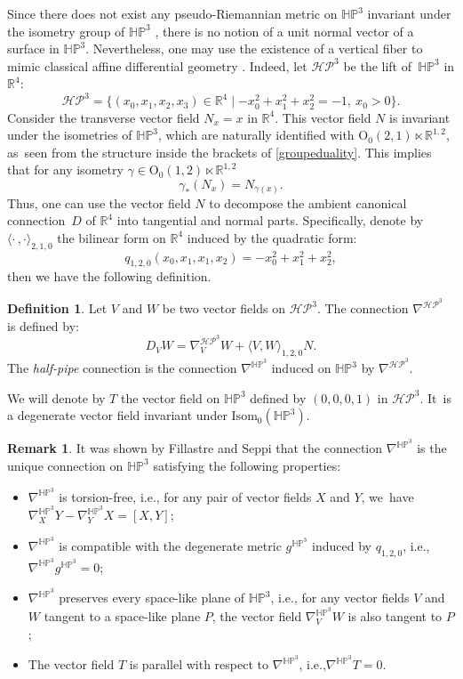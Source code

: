 \documentclass[11pt]{article}
\newcommand{\ie}{i.e.,\xspace}
\theoremstyle{plain}
\theoremstyle{definition}
\newtheorem{defi}[cor]{Definition}
\newtheorem{remark}[cor]{Remark}
\newcommand{\minko}{\mathbb{R}^{1,2}}
\newcommand{\HP}{\mathbb{HP}^3}
\newcommand{\isom}{\mathrm{Isom}_0}
\newcommand{\inner}[1] {\langle #1 \rangle}
\begin{document}
Since there does not exist any pseudo-Riemannian metric on $\HP$ invariant under the isometry group of $\HP$ \cite[Fact 3.11]{fillastreseppi}, there is no notion of a unit normal vector of a surface in $\HP$. Nevertheless, one may use the existence of a vertical fiber to mimic classical affine differential geometry \cite{affine_diff_geometry}. Indeed, let $\mathcal{HP}^3$ be the lift of~$\HP$ in $\mathbb{R}^4$:
\[
\mathcal{HP}^3=\{(x_0,x_1,x_2,x_3)\in\mathbb{R}^4\mid -x_0^2+x_1^2+x_2^2=-1, \ x_0>0 \}.
\]
Consider the transverse vector field $N_x=x$ in $\mathbb{R}^4$. This vector field $N$ is invariant under the isometries of $\HP$, which are naturally identified with $\mathrm{O}_{0}(2,1)\ltimes\minko$, as~seen from the structure inside the brackets of \eqref{groupeduality}. This implies that for any isometry $\gamma\in\mathrm{O}_{0}(1,2)\ltimes\minko$
\[
\gamma_{*}(N_x) = N_{\gamma(x)}.
\]
Thus, one can use the vector field $N$ to decompose the ambient canonical connection~$D$ of $\mathbb{R}^4$ into tangential and normal parts. Specifically, denote by $\inner{\cdot\,,\cdot}_{2,1,0}$ the bilinear form on $\mathbb{R}^4$ induced by the quadratic form:
\[
q_{1,2,0}(x_0,x_1,x_1,x_2)=-x_0^2+x_1^2+x_2^2,
\]
then we have the following definition.

\begin{defi} Let $V$ and $W$ be two vector fields on $\mathcal{HP}^3$. The connection
$\nabla^{\mathcal{HP}^3}$ is defined by:
\[
D_VW=\nabla^{\mathcal{HP}^3}_VW+\inner{V,W}_{1,2,0}N.
\]
The \emph{half-pipe} connection is the connection $\nabla^{\HP}$
induced on $\HP$ by $\nabla^{\mathcal{HP}^3}$.
\end{defi}
We will denote by $T$ the vector field on $\HP$ defined by $(0, 0, 0, 1)$ in $\mathcal{HP}^3$. It~is a degenerate vector field invariant under $\isom(\HP)$.
\begin{remark}
It was shown by Fillastre and Seppi \cite[Props.\, 5.3 \& 5.11]{fillastreseppi} that the connection $\nabla^{\HP}$ is the unique connection on $\HP$ satisfying the following properties:
\begin{itemize}
\item $\nabla^{\HP}$ is torsion-free, \ie for any pair of vector fields $X$ and $Y$, we~have $\nabla^{\HP}_X Y - \nabla^{\HP}_Y X = [X, Y]$;
\item $\nabla^{\HP}$ is compatible with the degenerate metric $g^{\HP}$ induced by $q_{1,2,0}$, \ie $\nabla^{\HP} g^{\HP} = 0$;
\item $\nabla^{\HP}$ preserves every space-like plane of $\HP$, \ie for any vector fields $V$ and $W$ tangent to a space-like plane $P$, the vector field $\nabla^{\HP}_V W$ is also tangent to $P$;
\item The vector field $T$ is parallel with respect to $\nabla^{\HP}$, \ie $\nabla^{\HP} T = 0$.
\end{itemize}
\end{remark}
\end{document}

